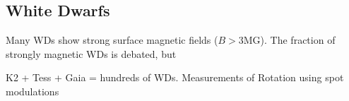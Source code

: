 {\color{red} \subsection{White Dwarfs}}
Many WDs show strong surface magnetic fields ($B>$3MG). The fraction of strongly magnetic WDs is debated, but  

K2 + Tess + Gaia = hundreds of WDs. Measurements of Rotation using spot modulations